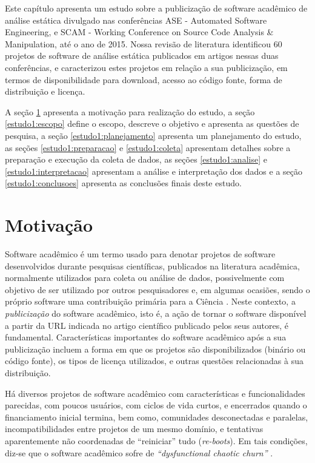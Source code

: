 \label{estudo1}

Este capítulo apresenta um estudo sobre a publicização de software acadêmico
de análise estática divulgado nas conferências ASE - Automated Software Engineering, e 
SCAM - Working Conference on Source Code Analysis \& Manipulation, até o ano de 2015.
Nossa revisão de literatura identificou
60 projetos de software de análise estática
publicados em artigos nessas duas conferências, e caracterizou estes
projetos em relação a sua publicização, em termos de disponibilidade para
download, acesso ao código fonte, forma de distribuição e licença.

A seção \ref{estudo1:introducao} apresenta a motivação para realização do estudo,
a seção \ref{estudo1:escopo} define o escopo, descreve o objetivo e apresenta as questões de pesquisa,
a seção \ref{estudo1:planejamento} apresenta um planejamento do estudo,
as seções \ref{estudo1:preparacao} e \ref{estudo1:coleta} apresentam detalhes sobre a preparação e execução da coleta de dados,
as seções \ref{estudo1:analise} e \ref{estudo1:interpretacao} apresentam a análise e interpretação dos dados e
a seção \ref{estudo1:conclusoes} apresenta as conclusões finais deste estudo.

\section{Motivação} \label{estudo1:introducao} %

Software acadêmico é um termo usado para denotar
projetos de software desenvolvidos durante pesquisas científicas,
publicados na literatura acadêmica, normalmente utilizados para coleta ou
análise de dados, possivelmente com objetivo de ser utilizado por outros
pesquisadores e, em algumas ocasiões, sendo o próprio software uma contribuição
primária para a Ciência \cite{howison2011scientific}.
%
Neste contexto, a \textit{publicização} do software acadêmico, isto é,
a ação de tornar o software disponível 
a partir da URL indicada no artigo científico publicado pelos seus autores,
é fundamental.
Características importantes do software acadêmico após a sua publicização
incluem a forma em que os projetos são disponibilizados (binário ou código fonte),
os tipos de licença utilizados, e outras questões relacionadas à sua distribuição.

Há diversos projetos de software acadêmico com características e
funcionalidades parecidas, com poucos usuários, com ciclos de vida curtos, e
encerrados quando o financiamento inicial termina, bem como, comunidades
desconectadas e paralelas, incompatibilidades entre projetos de um mesmo
domínio, e tentativas aparentemente não coordenadas de ``reiniciar'' tudo ({\it re-boots}).
Em tais condições, diz-se que o software acadêmico sofre de 
{\it ``dysfunctional chaotic churn''} \cite{howison2015understanding}.

